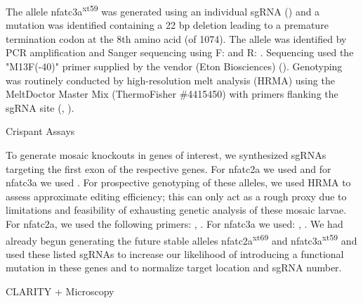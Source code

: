 The allele nfatc3a\textsuperscript{xt59} was generated using an individual sgRNA () and a mutation was identified containing a 22 bp deletion leading to a premature termination codon at the 8th amino acid (of 1074). The allele was identified by PCR amplification and Sanger sequencing using F:  and R: . Sequencing used the "M13F(-40)" primer supplied by the vendor (Eton Biosciences) (). Genotyping was routinely conducted by high-resolution melt analysis (HRMA) using the MeltDoctor Master Mix (ThermoFisher \#4415450) with primers flanking the sgRNA site (, ). 

Crispant Assays 

To generate mosaic knockouts in genes of interest, we synthesized sgRNAs targeting the first exon of the respective genes. For nfatc2a we used  and for nfatc3a we used . For prospective genotyping of these alleles, we used HRMA to assess approximate editing efficiency; this can only act as a rough proxy due to limitations and feasibility of exhausting genetic analysis of these mosaic larvae. For nfatc2a, we used the following primers: , . For nfatc3a we used: , . We had already begun generating the future stable alleles nfatc2a\textsuperscript{xt69} and nfatc3a\textsuperscript{xt59} and used these listed sgRNAs to increase our likelihood of introducing a functional mutation in these genes and to normalize target location and sgRNA number.


CLARITY + Microscopy

